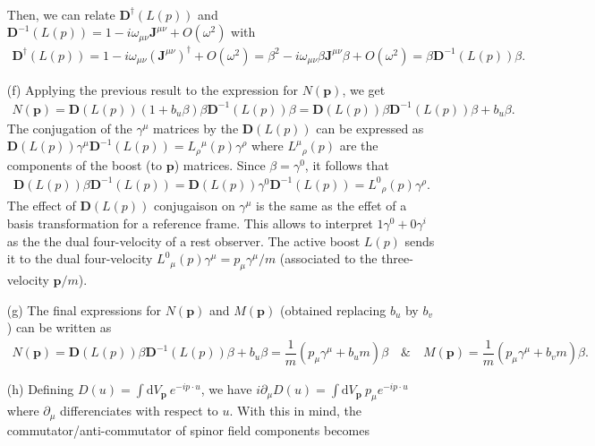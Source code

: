 \documentclass[10pt, a4paper]{article}
\begin{document}
\begin{enumerate}
\begin{align*}
  \end{align*}
  Then, we can relate $\mathbf{D}^{\dagger}(L(p))$ and $\mathbf{D}^{-1}(L(p)) = 1 - i \omega_{\mu\nu} \mathbf{J}^{\mu\nu} + O(\omega^2)$ with 
  \begin{align*}
    \mathbf{D}^\dagger(L(p)) = 1 - i \omega_{\mu\nu} (\mathbf{J}^{\mu\nu})^\dagger + O(\omega^2) =  \beta^2 - i \omega_{\mu\nu} \beta \mathbf{J}^{\mu\nu}\beta + O(\omega^2) = \beta \mathbf{D}^{-1}(L(p)) \beta.
  \end{align*} 
  \item[(f)] Applying the previous result to the expression for $N(\mathbf{p})$, we get 
  \begin{align*}
    N(\mathbf{p}) = \mathbf{D}(L(p)) (1 + b_u \beta) \beta \mathbf{D}^{-1}(L(p)) \beta = \mathbf{D}(L(p)) \beta \mathbf{D}^{-1}(L(p)) \beta + b_u \beta. 
  \end{align*}
  The conjugation of the $\gamma^\mu$ matrices by the $\mathbf{D}(L(p))$ can be expressed as $\mathbf{D}(L(p)) \gamma^\mu \mathbf{D}^{-1}(L(p)) = L_{\rho}{}^{\mu}(p)\gamma^\rho$ where $L^{\mu}{}_{\rho}(p)$ are the components of the boost (to $\mathbf{p}$) matrices. Since $\beta = \gamma^0$, it follows that 
  \begin{align*}
    \mathbf{D}(L(p)) \beta \mathbf{D}^{-1}(L(p)) = \mathbf{D}(L(p)) \gamma^0 \mathbf{D}^{-1}(L(p)) = L^{0}{}_{\rho}(p)\gamma^\rho. 
  \end{align*}
  The effect of $\mathbf{D}(L(p))$ conjugaison on $\gamma^\mu$ is the same as the effet of a basis transformation for a reference frame. This allows to interpret $1\gamma^0 + 0\gamma^i$ as the  the dual four-velocity of a rest observer. The active boost $L(p)$ sends it to the dual  four-velocity $L^{0}{}_{\mu}(p)\gamma^\mu = p_\mu \gamma^\mu/m$ (associated to the three-velocity $\mathbf{p}/m$). 
  \item[(g)] The final expressions for $N(\mathbf{p})$ and $M(\mathbf{p})$ (obtained replacing $b_u$ by $b_v$) can be written as 
  \begin{align*}
    N(\mathbf{p})= \mathbf{D}(L(p)) \beta \mathbf{D}^{-1}(L(p)) \beta + b_u \beta = \dfrac{1}{m}(p_\mu \gamma^\mu + b_u m) \beta \quad \& \quad M(\mathbf{p})= \dfrac{1}{m}(p_\mu \gamma^\mu + b_v m) \beta.  
  \end{align*}
  \item[(h)] Defining $D(u) = \int \text{d}V_\mathbf{p} \ e^{-ip\cdot u}$, we have $i\partial_\mu D(u) = \int \text{d}V_\mathbf{p} \ p_{\mu} e^{-ip\cdot u}$ where $\partial_\mu$ differenciates with respect to $u$. With this in mind, the commutator/anti-commutator of spinor field components becomes

\end{enumerate}
\end{document}
